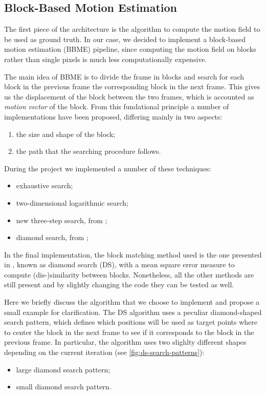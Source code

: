 \subsection{Block-Based Motion Estimation}
\label{sec:BBME}
The first piece of the architecture is the algorithm to compute the motion field to be used as ground truth.
In our case, we decided to implement a block-based motion estimation (BBME) pipeline, since computing the motion field on blocks rather than single pixels is much less computationally expensive.

The main idea of BBME is to divide the frame in blocks and search for each block in the previous frame the corresponding block in the next frame.
This gives us the displacement of the block between the two frames, which is accounted as \emph{motion vector} of the block.
From this fundational principle a number of implementations have been proposed, differing mainly in two aspects:
\begin{enumerate}
    \item the size and shape of the block;
    \item the path that the searching procedure follows.
\end{enumerate}

During the project we implemented a number of these techniques:
\begin{itemize}
    \item exhaustive search;
    \item two-dimensional logarithmic search;
    \item new three-step search, from \cite{Li94};
    \item diamond search, from \cite{Zhu2000};
\end{itemize}

In the final implementation, the block matching method used is the one presented in \cite{Zhu2000}, known as diamond search (DS),  with a mean square error measure to compute (dis-)similarity between blocks.
Nonetheless, all the other methods are still present and by slightly changing the code they can be tested as well.

Here we briefly discuss the algorithm that we choose to implement and propose a small example for clarification.
The DS algorithm uses a peculiar diamond-shaped search pattern, which defines which positions will be used as target points where to center the block in the next frame to see if it corresponds to the block in the previous frame. In particular, the algorithm uses two slighlty different shapes depending on the current iteration (see \cref*{fig:ds-search-patterns}):
\begin{itemize}
    \item large diamond search pattern;
    \item small diamond search pattern.
\end{itemize}

